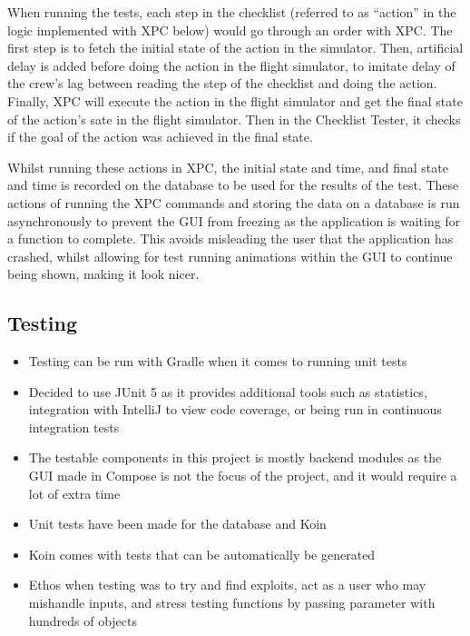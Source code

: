 \documentclass[../dissertation.tex]{subfiles}
\begin{document}
When running the tests, each step in the checklist (referred to as \enquote{action} in 
the logic implemented with XPC below) would go through an order with XPC.
The first step is to fetch the initial state of the action in the simulator.
Then, artificial delay is added before doing the
action in the flight simulator, to imitate delay of the crew's lag between reading the step of
the checklist and doing the action. Finally, XPC will execute the action in the flight simulator
and get the final state of the action's sate in the flight simulator.
Then in the Checklist Tester, it checks if the goal of the action was achieved in the final
state.

Whilst running these actions in XPC, the initial state and time, and final state and time
is recorded on the database to be used for the results of the test. These actions of
running the XPC commands and storing the data on a database is run asynchronously to prevent
the GUI from freezing as the application is waiting for a function to complete. This avoids
misleading the user that the application has crashed, whilst allowing for test running animations
within the GUI to continue being shown, making it look nicer.


\subsection{Testing}
\begin{itemize}
  \item Testing can be run with Gradle when it comes to running unit tests
  \item Decided to use JUnit 5 as it provides additional tools such as
    statistics, integration with IntelliJ to view code coverage,
    or being run in continuous integration tests
  \item The testable components in this project is mostly backend modules as
    the GUI made in Compose is not the focus of the project, and it would
    require a lot of extra time
  \item Unit tests have been made for the database and Koin
  \item Koin comes with tests that can be automatically be generated
  \item Ethos when testing was to try and find exploits, act as a
    user who may mishandle inputs, and stress testing functions
    by passing parameter with hundreds of objects
\end{itemize}
\end{document}
